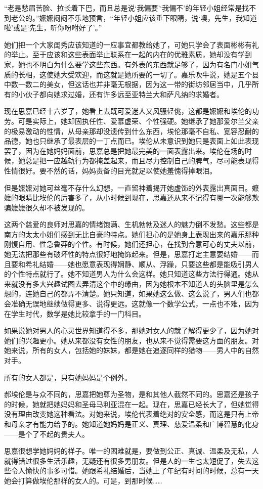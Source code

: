 \par “老是愁眉苦脸、拉长着下巴，而且总是说‘我偏要’‘我偏不’的年轻小姐经常是找不到老公的。”嬷嬷闷闷不乐地预言，“年轻小姐应该垂下眼睛，说‘噢，先生，我知道啦’或是‘先生，听你吩咐好了’。”
\par 她们把一个大家闺秀应该知道的一应事宜都教给她了，可她只学会了表面彬彬有礼的举止。至于应该和这些表面举止联系在一起的内在的优雅素质，她却没有学到家，她也不明白为什么要学这些东西。有外表的东西就足够了，因为有名门小姐气质的长相，这使她大受欢迎，而这就是她所要的一切了。嘉乐吹牛说，她是五个县中数一数二的美女，但这话也并非毫无根据，因为这一带的街坊邻居当中，几乎所有的小伙子都向她求过婚，还有许多远至亚特兰大和萨凡纳的求婚者。
\par 现在思嘉已经十六岁了，她看上去既可爱迷人又风骚轻佻，这都是嬷嬷和埃伦的功劳。可是实际上，她却固执任性、爱慕虚荣、个性强硬。她继承了她那爱尔兰父亲的极易激动的性情，从母亲那却没遗传到什么东西，埃伦那毫不自私、宽容忍耐的品德，她也只继承了最表层的一丁点而已。埃伦从未意识到她只是表面上如此表现罢了，因为在她妈妈面前，思嘉总是把她最完美的一面表露出来。埃伦在场的时候，她总是把一应越轨行为都掩盖起来，而且尽力控制自己的脾气，尽可能表现得性情很好。要不然的话，妈妈责备的目光就足以使她羞愧得掉眼泪。
\par 但是嬷嬷对她可丝毫不存什么幻想，一直留神着揭开她虚饰的外表露出真面目。嬷嬷的眼睛比埃伦的厉害多了，从小时候到现在，思嘉还从来不记得有哪一次能够欺骗嬷嬷很久却不被发现的。
\par 这两个慈爱的良师对思嘉的情绪饱满、生机勃勃及迷人的魅力倒不发愁。这些都是南方的太太小姐们感到无比自豪的特点。她们担心的是她身上表现出来的嘉乐那种刚愎自用、性急鲁莽的个性。有时候，她们还担心，在找到合意可心的丈夫以前，她无法把那些有破坏性的特点很好地掩饰起来。但是，思嘉打定主意要结婚——而且要和希礼结婚——她也愿意表现得娴静、顺从、浮躁，只要这些都是能吸引男人的个性特点就行了。她不知道男人为什么会这样。她只知道这些方法行得通。她从来就没有多大兴趣试图去弄清这个中的缘由，因为她根本不知道人的头脑里是怎么想的，连她自己的都弄不清楚。她只知道，如果她这么做、这么说了，男人们也都会准确无误地继续做得更多、说得更远。这就像一个数学公式，一点也不难，因为在学生时代，数学是她比较拿手的一门科目。
\par 如果说她对男人的心灵世界知道得不多，那她对女人的就了解得更少了，因为她对她们的兴趣更小。她从来都没有女性的朋友，也从来不觉得需要这方面的朋友。对她来说，所有的女人，包括她的妹妹，都是她在追逐同样的猎物——男人中的自然对手。
\par 所有的女人都是，只有她妈妈是个例外。
\par 郝埃伦是与众不同的，思嘉把她尊为圣物，是和其他人截然不同的。思嘉还是孩子的时候，她就把她妈妈和圣母马利亚混在一起。现在，思嘉已经长大了，但她觉得没有理由改变她这种看法。对她来说，埃伦代表着绝对的安全感，而这是只有上帝和母亲才有能力给予的。她知道她妈妈是正义、真理、慈爱温柔和广博智慧的化身——是个了不起的贵夫人。
\par 思嘉很想学她妈妈的样子。唯一的困难就是，要做到公正、真诚、温柔及无私，人就得错过很多生活乐趣，无疑还有很多男朋友。但是人的一生也太短促了，失去这些令人愉快的事多可惜。她跟希礼结婚后，当她上了年纪有时间的时候，总有一天她会打算做埃伦那样的女人的。可是，到那时候……


